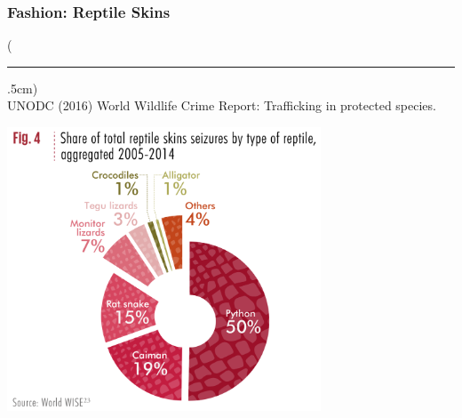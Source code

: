 \documentclass[10pt]{beamer}
\newenvironment{reference}[2]{%
	\begin{textblock*}{\textwidth}(#1,#2)
		\tiny\bgroup\color{gray}}{\egroup\end{textblock*}}
\begin{document}
\begin{frame}[t]
\frametitle{Fashion: Reptile Skins}
\vspace{0.25cm}

	\begin{reference}{4mm}{92mm}
		\rule{1.5cm}{0.25pt}\\
		UNODC (2016) World Wildlife Crime Report: Trafficking in protected species.
	\end{reference}
	

	\begin{center}
		\includegraphics[width=0.7\textwidth]{figures/fashion_species.png}
	\end{center}
\end{frame}
\end{document}
